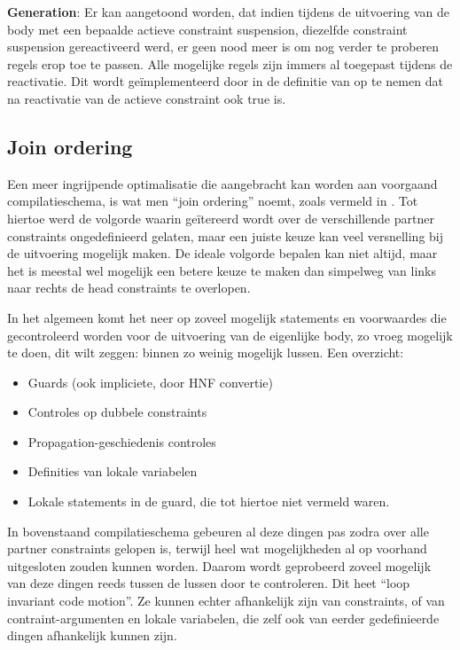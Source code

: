 {\bf Generation}: Er kan aangetoond worden, dat indien tijdens de uitvoering van de body met een bepaalde actieve constraint suspension, diezelfde constraint suspension gereactiveerd werd, er geen nood meer is om nog verder te proberen regels erop toe te passen. Alle mogelijke regels zijn immers al toegepast tijdens de reactivatie. Dit wordt ge\"implementeerd door in de definitie van  op te nemen dat  na reactivatie van de actieve constraint ook true is.

\subsection{Join ordering} \label{sec:joinorder}


Een meer ingrijpende optimalisatie die aangebracht kan worden aan voorgaand compilatieschema, is wat men ``join ordering'' noemt, zoals vermeld in \cite{duck:optimizing}. Tot hiertoe werd de volgorde waarin ge\"itereerd wordt over de verschillende partner constraints ongedefinieerd gelaten, maar een juiste keuze kan veel versnelling bij de uitvoering mogelijk maken. De ideale volgorde bepalen kan niet altijd, maar het is meestal wel mogelijk een betere keuze te maken dan simpelweg van links naar rechts de head constraints te overlopen.

In het algemeen komt het neer op zoveel mogelijk statements en voorwaardes die gecontroleerd worden voor de uitvoering van de eigenlijke body, zo vroeg mogelijk te doen, dit wilt zeggen: binnen zo weinig mogelijk lussen. Een overzicht: \begin{itemize}
  \item Guards (ook impliciete, door HNF convertie)
  \item Controles op dubbele constraints
  \item Propagation-geschiedenis controles
  \item Definities van lokale variabelen
  \item Lokale statements in de guard, die tot hiertoe niet vermeld waren.
\end{itemize}
In bovenstaand compilatieschema gebeuren al deze dingen pas zodra over alle partner constraints gelopen is, terwijl heel wat mogelijkheden al op voorhand uitgesloten zouden kunnen worden. Daarom wordt geprobeerd zoveel mogelijk van deze dingen reeds tussen de lussen door te controleren. Dit heet ``loop invariant code motion''. Ze kunnen echter afhankelijk zijn van constraints, of van contraint-argumenten en lokale variabelen, die zelf ook van eerder gedefinieerde dingen afhankelijk kunnen zijn.

